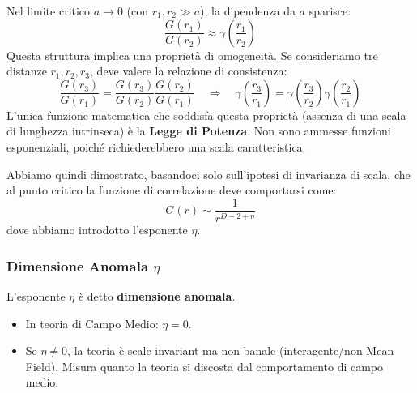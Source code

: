 \noindent Nel limite critico $a \to 0$ (con $r_1, r_2 \gg a$), la dipendenza da $a$ sparisce:
\begin{equation}
\frac{G(r_1)}{G(r_2)} \approx \gamma\left(\frac{r_1}{r_2}\right)
\end{equation}
Questa struttura implica una proprietà di omogeneità. Se consideriamo tre distanze $r_1, r_2, r_3$, deve valere la relazione di consistenza:
\begin{equation}
\frac{G(r_3)}{G(r_1)} = \frac{G(r_3)}{G(r_2)} \frac{G(r_2)}{G(r_1)} \quad \Longrightarrow \quad \gamma\left(\frac{r_3}{r_1}\right) = \gamma\left(\frac{r_3}{r_2}\right) \gamma\left(\frac{r_2}{r_1}\right)
\end{equation}
L'unica funzione matematica che soddisfa questa proprietà (assenza di una scala di lunghezza intrinseca) è la \textbf{Legge di Potenza}. Non sono ammesse funzioni esponenziali, poiché richiederebbero una scala caratteristica.

Abbiamo quindi dimostrato, basandoci solo sull'ipotesi di invarianza di scala, che al punto critico la funzione di correlazione deve comportarsi come:
\begin{equation}
G(r) \sim \frac{1}{r^{D-2+\eta}}
\end{equation}
dove abbiamo introdotto l'esponente $\eta$.

\subsubsection{Dimensione Anomala $\eta$}
L'esponente $\eta$ è detto \textbf{dimensione anomala}.
\begin{itemize}
    \item In teoria di Campo Medio: $\eta = 0$.
    \item Se $\eta \neq 0$, la teoria è scale-invariant ma non banale (interagente/non Mean Field). Misura quanto la teoria si discosta dal comportamento di campo medio.
\end{itemize}

